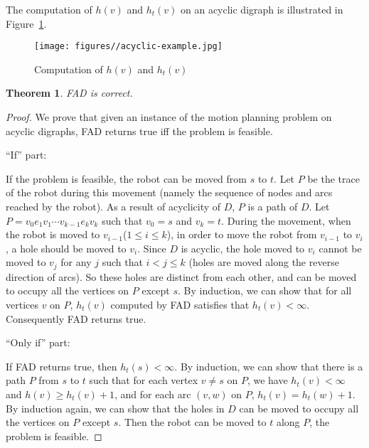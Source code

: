 \documentclass{article}
\newtheorem{thm}{Theorem}
\begin{document}
\clearpage

The computation of $h(v)$ and $h_t(v)$ on an acyclic digraph is
illustrated in Figure~\ref{fig:acyclic-example}.

\begin{figure}[ht]
\centering
  \texttt{[image: figures//acyclic-example.jpg]}
  \caption{Computation of $h(v)$ and $h_t(v)$}\label{fig:acyclic-example}
\end{figure}



\begin{thm}
FAD is correct.
\end{thm}



\begin{proof}

We prove that given an instance of the motion planning problem on
acyclic digraphs, FAD returns true iff the problem is feasible.

\noindent ``If'' part:

If the problem is feasible, the robot can be moved from $s$ to $t$.
Let $P$ be the trace of the robot during this movement (namely the
sequence of nodes and arcs reached by the robot). As a result of
acyclicity of $D$, $P$ is a path of $D$. Let $P=v_0e_1v_1\cdots
v_{k-1}e_k v_k$ such that $v_0=s$ and $v_k=t$. During the movement,
when the robot is moved to $v_{i-1}$($1 \le i \le k$), in order to
move the robot from $v_{i-1}$ to $v_{i}$, a hole should be moved to
$v_{i}$. Since $D$ is acyclic, the hole moved to $v_{i}$ cannot be
moved to $v_j$ for any $j$ such that $i < j \le k$ (holes are moved
along the reverse direction of arcs). So these holes are distinct
from each other, and can be moved to occupy all the vertices on $P$
except $s$. By induction, we can show that for all vertices $v$ on
$P$, $h_t(v)$ computed by FAD satisfies that $h_t(v) < \infty$.
Consequently FAD returns true.

\noindent ``Only if'' part:

If FAD returns true, then $h_t(s) < \infty$. By induction, we can
show that there is a path $P$ from $s$ to $t$ such that for each
vertex $v \ne s$ on $P$, we have $h_t(v)< \infty$ and $h(v) \ge
h_t(v)+1$, and for each arc $(v,w)$ on $P$, $h_t(v)=h_t(w)+1$. By
induction again, we can show that the holes in $D$ can be moved to
occupy all the vertices on $P$ except $s$. Then the robot can be
moved to $t$ along $P$, the problem is feasible.
\end{proof}
\end{document}
